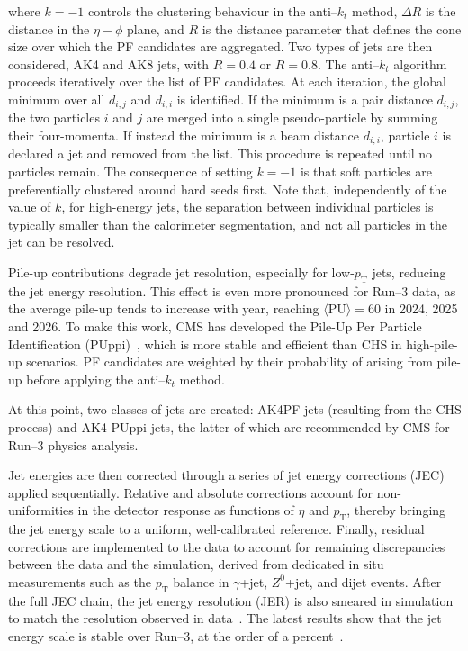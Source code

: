 \noindent where $k=-1$ controls the clustering behaviour in the anti--$k_t$ method, $\Delta R$ is the distance in the $\eta{-}\phi$ plane, and $R$ is the distance parameter that defines the cone size over which the PF candidates are aggregated. Two types of jets are then considered, AK4 and AK8 jets, with $R = 0.4$ or $R = 0.8$. The anti--$k_t$ algorithm proceeds iteratively over the list of PF candidates. At each iteration, the global minimum over all $d_{i,j}$ and $d_{i,i}$ is identified. If the minimum is a pair distance $d_{i,j}$, the two particles $i$ and $j$ are merged into a single pseudo-particle by summing their four-momenta. If instead the minimum is a beam distance $d_{i,i}$, particle $i$ is declared a jet and removed from the list. This procedure is repeated until no particles remain. The consequence of setting $k=-1$ is that soft particles are preferentially clustered around hard seeds first. Note that, independently of the value of $k$, for high-energy jets, the separation between individual particles is typically smaller than the calorimeter segmentation, and not all particles in the jet can be resolved.

\vspace{0.5 cm}

Pile-up contributions degrade jet resolution, especially for low-$p_{\mathrm{T}}$ jets, reducing the jet energy resolution. This effect is even more pronounced for Run--3 data, as the average pile-up tends to increase with year, reaching $\langle \textrm{PU} \rangle=60$ in 2024, 2025 and 2026. To make this work, CMS has developed the Pile-Up Per Particle Identification (PUppi)~\cite{PUPPI_cms}, which is more stable and efficient than CHS in high-pile-up scenarios. PF candidates are weighted by their probability of arising from pile-up before applying the anti--$k_t$ method. 

At this point, two classes of jets are created: AK4PF jets (resulting from the CHS process) and AK4 PUppi jets, the latter of which are recommended by CMS for Run--3 physics analysis.

Jet energies are then corrected through a series of jet energy corrections (JEC) applied sequentially. Relative and absolute corrections account for non-uniformities in the detector response as functions of $\eta$ and $p_{\mathrm{T}}$, thereby bringing the jet energy scale to a uniform, well-calibrated reference. Finally, residual corrections are implemented to the data to account for remaining discrepancies between the data and the simulation, derived from dedicated in situ measurements such as the $p_{\mathrm{T}}$ balance in $\gamma$+jet, $Z^0$+jet, and dijet events. After the full JEC chain, the jet energy resolution (JER) is also smeared in simulation to match the resolution observed in data~\cite{CMS-DP-2026-034}. The latest results show that the jet energy scale is stable over Run--3, at the order of a percent~\cite{CMS-DP-2025-042, CMS-DP-2025-044}.

